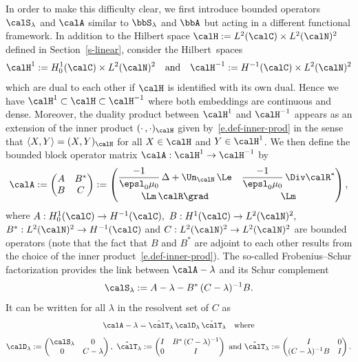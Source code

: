In order to make this difficulty clear, we first introduce bounded operators $\calS_\lambda$ and $\calA$ similar to $\bbS_\lambda$ and $\bbA$ but acting in a different functional framework. In addition to the Hilbert space $\calH := L^2(\calC) \times L^2(\calN)^2$ defined in Section~\ref{s-linear}, consider the Hilbert~spaces
\[
\calH^{1} := H^1_0(\calC) \times L^2(\calN)^2
\quad \text{and} \quad
\calH^{-1} := H^{-1}(\calC) \times L^2(\calN)^2
\]
which are dual to each other if $\calH$ is identified with its own dual. Hence we have $\calH^{1} \subset \calH \subset \calH^{-1}$ where both embeddings are continuous and dense. Moreover, the duality product between $\calH^{1}$ and $\calH^{-1}$ appears as an extension of the inner product $(\cdot\,,\cdot)_\calH$ given by~\eqref{e.def-inner-prod} in the sense that $\langle X,Y \rangle = (X,Y)_\calH$ for all $X \in \calH$ and $Y \in \calH^{1}$. We then define the bounded block operator matrix $\calA: \calH^{1} \to \calH^{-1}$ by
\[
\calA :=
\begin{pmatrix} A & B^* \\ B & C
\end{pmatrix}
:=
\begin{pmatrix}
\displaystyle \frac{-1}{\epsl_0 \mu_0}\,\Delta + \Un_\calN\,\Le & \displaystyle \frac{-1}{\epsl_0 \mu_0}\,\Div \calR^* \\[8pt]
\Lm\,\calR\grad & \Lm
\end{pmatrix},
\]
where $A: H^1_0(\calC) \to H^{-1}(\calC),$ $B: H^{1}(\calC) \to L^2(\calN)^2,$ $B^*: L^2(\calN)^2 \to H^{-1}(\calC)$ and $C: L^2(\calN)^2 \to L^2(\calN)^2$ are bounded operators (note that the fact that $B$ and $B^*$ are adjoint to each other results from the choice of the inner product~\eqref{e.def-inner-prod}). The so-called Frobenius--Schur factorization provides the link between $\calA - \lambda$ and its Schur complement
\[
\calS_\lambda := A - \lambda - B^*\, (C-\lambda)^{-1}B.
\]
It can be written for all $\lambda$ in the resolvent set of $C$ as
\begin{gather*}
\calA - \lambda = \hat{\calT}_\lambda \, \calD_\lambda \, \check{\calT}_\lambda
\quad\text{where}\\[5pt]
\calD_\lambda :=
\begin{pmatrix} \calS_\lambda & 0 \\ 0 & C-\lambda
\end{pmatrix},\
 \hat{\calT}_\lambda :=
\begin{pmatrix}
I & B^*\,(C-\lambda)^{-1} \\
0 & I
\end{pmatrix}
\text{ and }
\check{\calT}_\lambda :=
\begin{pmatrix}
 I & 0 \\
(C-\lambda)^{-1} B & I
\end{pmatrix}.
\end{gather*}
